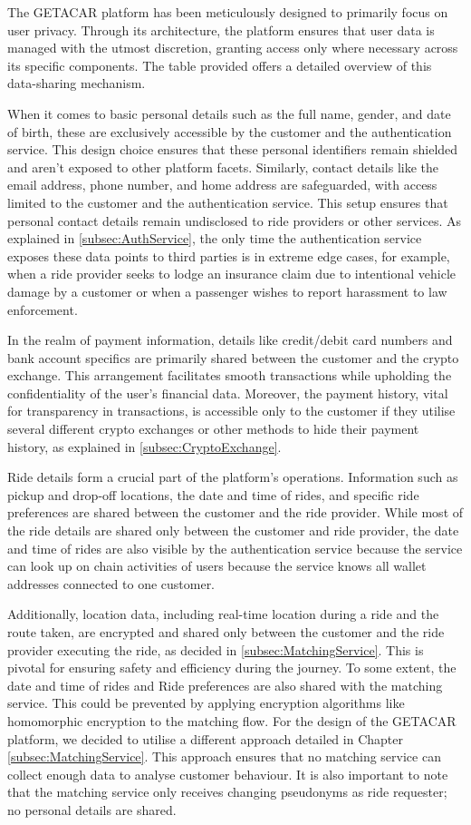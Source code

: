 The GETACAR platform has been meticulously designed to primarily focus on user privacy. Through its architecture, the platform ensures that user data is managed with the utmost discretion, granting access only where necessary across its specific components. The table provided offers a detailed overview of this data-sharing mechanism.


When it comes to basic personal details such as the full name, gender, and date of birth, these are exclusively accessible by the customer and the authentication service. This design choice ensures that these personal identifiers remain shielded and aren't exposed to other platform facets. Similarly, contact details like the email address, phone number, and home address are safeguarded, with access limited to the customer and the authentication service. This setup ensures that personal contact details remain undisclosed to ride providers or other services. As explained in \ref{subsec:AuthService}, the only time the authentication service exposes these data points to third parties is in extreme edge cases, for example, when a  ride provider seeks to lodge an insurance claim due to intentional vehicle damage by a customer or when a passenger wishes to report harassment to law enforcement.

In the realm of payment information, details like credit/debit card numbers and bank account specifics are primarily shared between the customer and the crypto exchange. This arrangement facilitates smooth transactions while upholding the confidentiality of the user's financial data. Moreover, the payment history, vital for transparency in transactions, is accessible only to the customer if they utilise several different crypto exchanges or other methods to hide their payment history, as explained in \ref{subsec:CryptoExchange}.

Ride details form a crucial part of the platform's operations. Information such as pickup and drop-off locations, the date and time of rides, and specific ride preferences are shared between the customer and the ride provider. While most of the ride details are shared only between the customer and ride provider, the date and time of rides are also visible by the authentication service because the service can look up on chain activities of users because the service knows all wallet addresses connected to one customer.


Additionally, location data, including real-time location during a ride and the route taken, are encrypted and shared only between the customer and the ride provider executing the ride, as decided in \ref{subsec:MatchingService}. This is pivotal for ensuring safety and efficiency during the journey. To some extent, the date and time of rides and Ride preferences are also shared with the matching service. This could be prevented by applying encryption algorithms like homomorphic encryption to the matching flow. For the design of the GETACAR platform, we decided to utilise a different approach detailed in Chapter \ref{subsec:MatchingService}. This approach ensures that no matching service can collect enough data to analyse customer behaviour. It is also important to note that the matching service only receives changing pseudonyms as ride requester; no personal details are shared. 

